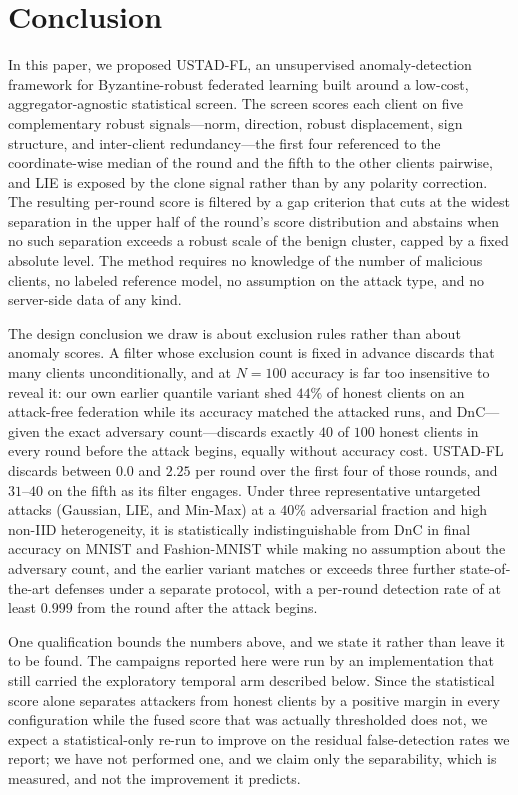\documentclass[journal]{IEEEtran}
\begin{document}
\section{Conclusion}
\label{sec:conclusion}

In this paper, we proposed USTAD-FL, an unsupervised anomaly-detection framework for Byzantine-robust federated learning built around a low-cost, aggregator-agnostic statistical screen. The screen scores each client on five complementary robust signals---norm, direction, robust displacement, sign structure, and inter-client redundancy---the first four referenced to the coordinate-wise median of the round and the fifth to the other clients pairwise, and LIE is exposed by the clone signal rather than by any polarity correction. The resulting per-round score is filtered by a gap criterion that cuts at the widest separation in the upper half of the round's score distribution and abstains when no such separation exceeds a robust scale of the benign cluster, capped by a fixed absolute level. The method requires no knowledge of the number of malicious clients, no labeled reference model, no assumption on the attack type, and no server-side data of any kind.

The design conclusion we draw is about exclusion rules rather than about anomaly scores. A filter whose exclusion count is fixed in advance discards that many clients unconditionally, and at $N=100$ accuracy is far too insensitive to reveal it: our own earlier quantile variant shed $44\%$ of honest clients on an attack-free federation while its accuracy matched the attacked runs, and DnC---given the exact adversary count---discards exactly $40$ of $100$ honest clients in every round before the attack begins, equally without accuracy cost. USTAD-FL discards between $0.0$ and $2.25$ per round over the first four of those rounds, and $31$--$40$ on the fifth as its filter engages. Under three representative untargeted attacks (Gaussian, LIE, and Min-Max) at a $40\%$ adversarial fraction and high non-IID heterogeneity, it is statistically indistinguishable from DnC in final accuracy on MNIST and Fashion-MNIST while making no assumption about the adversary count, and the earlier variant matches or exceeds three further state-of-the-art defenses under a separate protocol, with a per-round detection rate of at least $0.999$ from the round after the attack begins.

One qualification bounds the numbers above, and we state it rather than leave it to be found. The campaigns reported here were run by an implementation that still carried the exploratory temporal arm described below. Since the statistical score alone separates attackers from honest clients by a positive margin in every configuration while the fused score that was actually thresholded does not, we expect a statistical-only re-run to improve on the residual false-detection rates we report; we have not performed one, and we claim only the separability, which is measured, and not the improvement it predicts.
\end{document}
